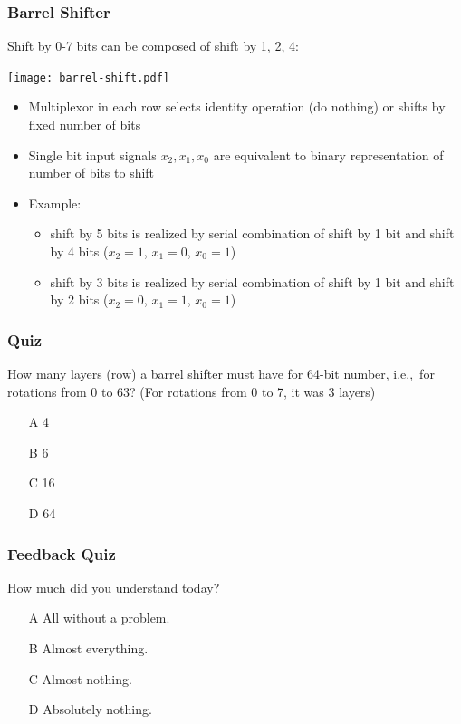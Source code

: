 \documentclass{beamer}
\begin{document}
\begin{frame}
\frametitle{Barrel Shifter}

Shift by 0-7 bits can be composed of shift by 1, 2, 4:
\begin{center}
   \texttt{[image: barrel-shift.pdf]}
\end{center}

\begin{itemize}
\item Multiplexor in each row selects identity operation (do nothing) or shifts by fixed number of bits
\item Single bit input signals $x_2,x_1,x_0$ are equivalent to binary representation of number of bits to shift
\item Example:
\begin{itemize}
\item shift by 5 bits is realized by serial combination of shift by 1 bit and shift by 4 bits ($x_2=1$, $x_1=0$, $x_0=1$)
\item shift by 3 bits is realized by serial combination of shift by 1 bit and shift by 2 bits ($x_2=0$, $x_1=1$, $x_0=1$)
\end{itemize}
\end{itemize}

\end{frame}


\begin{frame}
\frametitle{Quiz}

How many layers (row) a barrel shifter must have for 64-bit number, i.e.,\ for rotations from 0 to 63? (For rotations from 0 to 7, it was 3 layers)

\begin{itemize}
\item[A] 4
\item[B] 6
\item[C] 16
\item[D] 64
\end{itemize}

\end{frame}


\begin{frame}
\frametitle{Feedback Quiz}

How much did you understand today?
\begin{itemize}
\item[A] All without a problem.
\item[B] Almost everything.
\item[C] Almost nothing.
\item[D] Absolutely nothing.
\end{itemize}

\end{frame}
\end{document}
